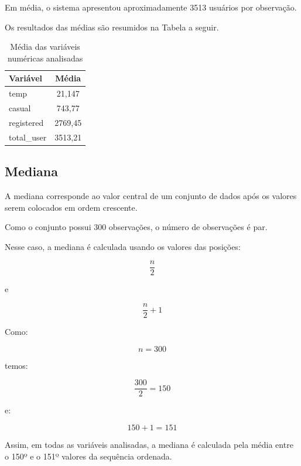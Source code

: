 \documentclass[12pt,a4paper]{article}
\begin{document}
Em média, o sistema apresentou aproximadamente 3513 usuários por
observação.

Os resultados das médias são resumidos na Tabela a seguir.

\begin{table}[H]
\centering
\caption{Média das variáveis numéricas analisadas}
\begin{tabular}{lc}
\toprule
\textbf{Variável} & \textbf{Média} \\
\midrule
temp & 21,147 \\
casual & 743,77 \\
registered & 2769,45 \\
total\_user & 3513,21 \\
\bottomrule
\end{tabular}
\end{table}

\subsection{Mediana}

A mediana corresponde ao valor central de um conjunto de dados após os
valores serem colocados em ordem crescente.

Como o conjunto possui 300 observações, o número de observações é par.

Nesse caso, a mediana é calculada usando os valores das posições:

\begin{equation}
\frac{n}{2}
\end{equation}

e

\begin{equation}
\frac{n}{2} + 1
\end{equation}

Como:

\begin{equation}
n = 300
\end{equation}

temos:

\begin{equation}
\frac{300}{2} = 150
\end{equation}

e:

\begin{equation}
150 + 1 = 151
\end{equation}

Assim, em todas as variáveis analisadas, a mediana é calculada pela média
entre o 150º e o 151º valores da sequência ordenada.
\end{document}
